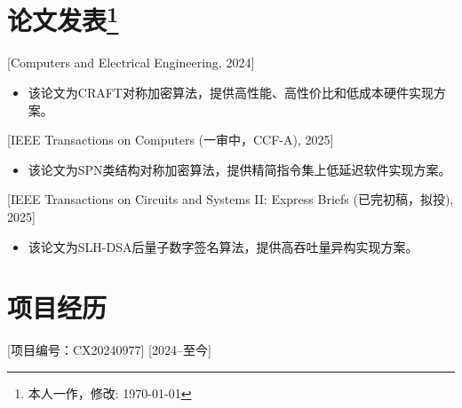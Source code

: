 \documentclass{resume}
\begin{document}


\section{论文发表\protect\footnote{本人一作，修改: \today}}

[Computers and Electrical Engineering, 2024]
\begin{itemize}
  \item 该论文为CRAFT对称加密算法，提供高性能、高性价比和低成本硬件实现方案。
\end{itemize}

[IEEE Transactions on Computers (一审中，CCF-A), 2025]
\begin{itemize}
  \item 该论文为SPN类结构对称加密算法，提供精简指令集上低延迟软件实现方案。
\end{itemize}

[IEEE Transactions on Circuits and Systems II: Express Briefs (已完初稿，拟投), 2025]
\begin{itemize}
  \item 该论文为SLH-DSA后量子数字签名算法，提供高吞吐量异构实现方案。
\end{itemize}

\section{项目经历}
[项目编号：CX20240977]
[2024--至今]
\end{document}

